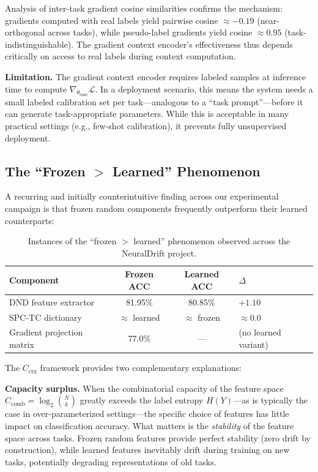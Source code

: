\documentclass{article}
\begin{document}
Analysis of inter-task gradient cosine similarities confirms the mechanism: gradients computed with real labels yield pairwise cosine $\approx -0.19$ (near-orthogonal across tasks), while pseudo-label gradients yield cosine $\approx 0.95$ (task-indistinguishable). The gradient context encoder's effectiveness thus depends critically on access to real labels during context computation.

\textbf{Limitation.} The gradient context encoder requires labeled samples at inference time to compute $\nabla_{\theta_\mathrm{base}} \mathcal{L}$. In a deployment scenario, this means the system needs a small labeled calibration set per task---analogous to a ``task prompt''---before it can generate task-appropriate parameters. While this is acceptable in many practical settings (e.g., few-shot calibration), it prevents fully unsupervised deployment.

\subsection{The ``Frozen $>$ Learned'' Phenomenon}
\label{sec:frozen_learned_discussion}

A recurring and initially counterintuitive finding across our experimental campaign is that frozen random components frequently outperform their learned counterparts:

\begin{table}[h]
\centering
\small
\caption{Instances of the ``frozen $>$ learned'' phenomenon observed across the NeuralDrift project.}
\label{tab:frozen_learned}
\begin{tabular}{lccl}
\toprule
Component & Frozen ACC & Learned ACC & $\Delta$ \\
\midrule
DND feature extractor & 81.95\% & 80.85\% & $+1.10$ \\
SPC-TC dictionary & $\approx$ learned & $\approx$ frozen & $\approx 0.0$ \\
Gradient projection matrix & 77.0\% & --- & (no learned variant) \\
\bottomrule
\end{tabular}
\end{table}

The $C_\mathrm{ctx}$ framework provides two complementary explanations:

\textbf{Capacity surplus.} When the combinatorial capacity of the feature space $C_\mathrm{comb} = \log_2 \binom{N}{k}$ greatly exceeds the label entropy $H(Y)$---as is typically the case in over-parameterized settings---the specific choice of features has little impact on classification accuracy. What matters is the \emph{stability} of the feature space across tasks. Frozen random features provide perfect stability (zero drift by construction), while learned features inevitably drift during training on new tasks, potentially degrading representations of old tasks.
\end{document}
